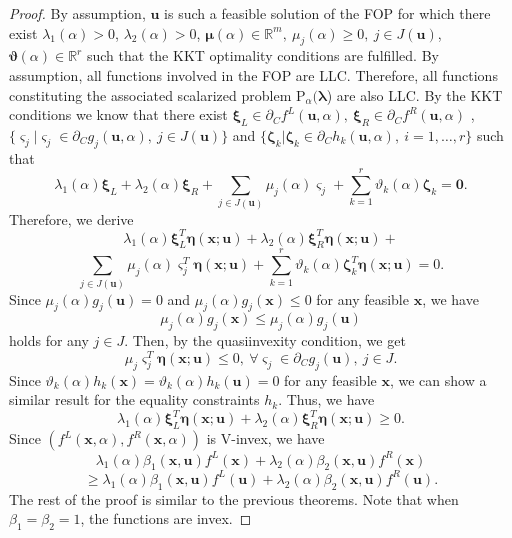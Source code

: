 \documentclass{article}
\theoremstyle{definition}
\begin{document}
\begin{proof} By assumption, $\boldsymbol u$ is such a feasible solution of the FOP for which there exist $\lambda_1( \alpha) > 0$, $\lambda_2( \alpha) > 0$, $\boldsymbol { \mu}( \alpha) \in \mathbb R^{m},\  \mu_j( \alpha) \geq 0,\ j \in J(\boldsymbol{u})$, $\boldsymbol { \vartheta}( \alpha) \in \mathbb R^r$ such that the KKT optimality conditions are fulfilled. By assumption, all functions involved in the FOP are LLC. Therefore, all functions constituting the associated scalarized problem P$_{\alpha}( {\boldsymbol \lambda}$) are also LLC. By the KKT conditions we know that there exist $\boldsymbol \xi_L \in \partial_Cf^L(\boldsymbol u,  \alpha),\ \boldsymbol \xi_R \in \partial_C f^R(\boldsymbol u,  \alpha)$ ,$\{\boldsymbol \varsigma_j | \boldsymbol \varsigma_j \in \partial_Cg_j(\boldsymbol u,  \alpha),\ j \in J(\boldsymbol{u})\}$ and $\{\boldsymbol \zeta_k | \boldsymbol \zeta_k \in \partial_C h_k(\boldsymbol u,  \alpha),\ i=1,\dots,r\}$ such that
$$ \lambda_1( \alpha) \boldsymbol \xi_L +  \lambda_2( \alpha) \boldsymbol \xi_R + \sum_{j \in J(\boldsymbol{u})} \mu_j( \alpha) \boldsymbol \varsigma_j + \sum_{k=1}^r \vartheta_k( \alpha) \boldsymbol \zeta_k = \boldsymbol 0.$$
Therefore, we derive
$$ \lambda_1( \alpha) \boldsymbol \xi_{L}^T \boldsymbol \eta(\boldsymbol x; \boldsymbol u) +  \lambda_2( \alpha) \boldsymbol \xi_{R}^T \boldsymbol \eta(\boldsymbol x; \boldsymbol u) +$$ $$ \sum_{j \in J(\boldsymbol{u})} \mu_j( \alpha) \boldsymbol \varsigma_j^T \boldsymbol \eta(\boldsymbol x; \boldsymbol u)
+ \sum_{k=1}^r \vartheta_k( \alpha) \boldsymbol \zeta^T_k \boldsymbol \eta(\boldsymbol x; \boldsymbol u) = 0.$$
Since $ \mu_j( \alpha) g_j(\boldsymbol u) = 0$ and $ \mu_j( \alpha) g_j(\boldsymbol x) \leq 0$ for any feasible $\boldsymbol x$, we have
$$ \mu_j( \alpha) g_j(\boldsymbol x) \leq  \mu_j( \alpha) g_j(\boldsymbol u)$$
holds for any $j\in J$.
Then, by the quasiinvexity condition, we get
$$\mu_j \boldsymbol \varsigma_j^T \boldsymbol \eta(\boldsymbol x; \boldsymbol u) \leq 0,\ \forall \boldsymbol \varsigma_j \in \partial_C g_j(\boldsymbol u),\ j\in J.$$
Since $ \vartheta_k( \alpha) h_k(\boldsymbol x) =  \vartheta_k( \alpha) h_k(\boldsymbol u) = 0$ for any feasible $\boldsymbol x$, we can show a similar result for the equality constraints $h_k$. Thus, we have
$$ \lambda_1( \alpha) \boldsymbol \xi_{L}^T \boldsymbol \eta(\boldsymbol x; \boldsymbol u) +  \lambda_2( \alpha) \boldsymbol \xi_{R}^T \boldsymbol \eta(\boldsymbol x; \boldsymbol u) \geq 0.$$
Since $(f^L(\boldsymbol x,  \alpha), f^R(\boldsymbol x,  \alpha))$ is V-invex, we have
$$\lambda_1( \alpha)\beta_1(\boldsymbol x, \boldsymbol u)f^L(\boldsymbol x) + \lambda_2( \alpha)\beta_2(\boldsymbol x, \boldsymbol u)f^R(\boldsymbol x)$$
$$ \geq \lambda_1( \alpha)\beta_1(\boldsymbol x, \boldsymbol u)f^L(\boldsymbol u) + \lambda_2( \alpha)\beta_2(\boldsymbol x, \boldsymbol u)f^R(\boldsymbol u).$$
The rest of the proof is similar to the previous theorems. Note that when $\beta_1=\beta_2 = 1$, the functions are invex.
\end{proof}
\end{document}
